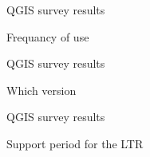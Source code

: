 \begin{frame}{QGIS survey results}
	\begin{block}{Frequancy of use}
	\end{block}
\end{frame}

\begin{frame}{QGIS survey results}
	\begin{block}{Which version}
	\end{block}
\end{frame}

\begin{frame}{QGIS survey results}
	\begin{block}{Support period for the LTR}
	\end{block}
\end{frame}

